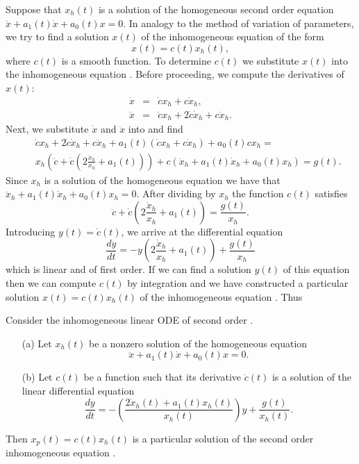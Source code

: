 \documentclass{ximera}
\begin{document}
Suppose that $x_h(t)$ is a solution of the 
homogeneous second order equation
$\ddot{x} + a_1(t)\dot{x} + a_0(t)x = 0$.  
In analogy to the method of variation of
parameters, we try to find a solution $x(t)$ of the 
inhomogeneous equation
 of the form
\[
x(t) = c(t) x_h(t),
\]
where $c(t)$ is a smooth function.  To determine $c(t)$ we substitute $x(t)$
into the inhomogeneous equation .  Before proceeding, we
compute the derivatives of $x(t)$:
\begin{eqnarray*}
\dot x  & = & \dot c x_h + c \dot{x}_h,\\
\ddot x & = & \ddot c x_h + 2 \dot c \dot{x}_h + c \ddot{x}_h.
\end{eqnarray*}
Next, we substitute $\dot{x}$ and $\ddot{x}$ into  and find
\begin{eqnarray*}
&& \ddot c x_h +2\dot c \dot{x}_h + c \ddot{x}_h +
a_1(t)\left(\dot c x_h + c \dot{x}_h \right)+ a_0(t) c x_h =\\
&& x_h \left(\ddot c + \dot c(2 \frac{\dot{x}_h}{x_h} + a_1(t))\right) +
 c(\ddot{x}_h +a_1(t) \dot{x}_h +a_0(t) x_h) = g(t).
\end{eqnarray*}
Since $x_h$ is a solution of the homogeneous equation we have that
$\ddot{x}_h +a_1(t) \dot{x}_h +a_0(t)x_h=0$. After dividing by $x_h$ the function
$c(t)$ satisfies
\[
\ddot c + \dot c\left( 2\frac{\dot{x}_h}{x_h} +a_1(t)\right) = \frac{g(t)}{x_h}.
\]
Introducing $y(t)=\dot c(t)$, we arrive at the differential equation
\[
\frac{dy}{dt} = -y\left( 2\frac{\dot{x}_h}{x_h} +a_1(t)\right) + \frac{g(t)}{x_h}
\]
which is linear and of first order.  If we can find a solution
$y(t)$ of this equation then we can compute $c(t)$ by integration
and we have constructed a 
particular solution 
$x(t)=c(t)x_h(t)$ of the
inhomogeneous equation . Thus
\begin{thm}  \label{thm:redord}
Consider the inhomogeneous linear ODE of second order .
\begin{itemize}
\item[(a)] Let $x_h(t)$ be a nonzero solution of the homogeneous equation
\[
\ddot{x} + a_1(t)\dot{x} + a_0(t)x = 0.
\]
\item[(b)] Let $c(t)$ be a function such that its derivative 
$\dot c(t)$ is a solution of the linear differential equation
\begin{equation}  \label{eq:ro}
\frac{dy}{dt} = -\left(\frac{2\dot x_h(t)+a_1(t) x_h(t)}{x_h(t)}\right)y
+\frac{g(t)}{x_h(t)}.
\end{equation}
\end{itemize}
Then $x_p(t)=c(t) x_h(t)$ is a particular 
solution of the second
order inhomogeneous equation .
\end{thm}
\end{document}
